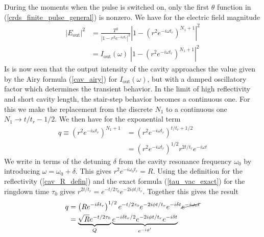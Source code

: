 During the moments when the pulse is switched on, only the first $\theta$ function in (\ref{crds_finite_pulse_general}) is nonzero. We have for the electric field magnitude
\begin{align} \label{cav_pulse_during}
	\left|E_\mathrm{out}\right|^2 &= \frac{T^2}{\left|1-r^2 e^{-i\omega t_r}\right|^2} \left|
	1 - \left(r^2 e^{-i \omega t_r}\right)^{N_1+1}
	\right|^2 \nonumber \\
	&= I_\mathrm{out}(\omega) \;
	\left|
	1 - \left(r^2 e^{-i \omega t_r}\right)^{N_1+1}
	\right|^2
\end{align}
Is is now seen that the output intensity of the cavity approaches the value given by the Airy formula (\ref{cav_airy}) for $I_\mathrm{out}(\omega)$, but with a damped oscillatory factor which determines the transient behavior. In the limit of high reflectivity and short cavity length, the stair-step behavior becomes a continuous one. For this we make the replacement from the discrete $N_1$ to a continuous one $N_1 \rightarrow t/t_r -1/2$.
We then have for the exponential term
\begin{align*}
	q \equiv \left(r^2 e^{-i\omega t_r}\right)^{N_1 +1} &= \left(r^2 e^{-i\omega t_r}\right)^{t/t_r + 1/2} \\
	&= \left(r^2 e^{-i\omega t_r}\right)^{1/2} r^{2t/t_r} e^{-i\omega t}
\end{align*}
We write in terms of the detuning $\delta$ from the cavity resonance frequency $\omega_0$ by introducing $\omega= \omega_0 + \delta$. This gives $r^2 e^{-i\omega_0 t_r} = R$. Using the definition for the reflectivity (\ref{cav_R_defin}) and the exact formula (\ref{tau_vac_exact}) for the ringdown time $\tau_0$ gives $r^{2t/t_r} = e^{-t/2\tau_0} e^{-2i\phi t/t_r}$. Together this gives the result
\begin{align*}
	q &= \left(R e^{-i\delta t_r}\right)^{1/2} e^{-t/2\tau_0} e^{-2i\phi t/t_r} e^{-i\delta t} \cancel{e^{-i \omega_0 t}} \\
	&= \underbrace{\sqrt{R} e^{-t/2\tau_0}}_Q \underbrace{e^{-i\delta t_r/2} e^{-2i\phi t/t_r} e^{-i\delta t}}_{e^{-i\phi'}}
\end{align*}

